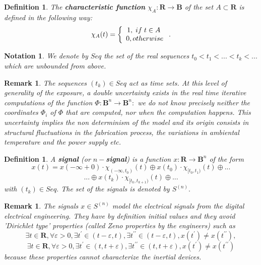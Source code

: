 \documentclass[12pt]{article}\usepackage{amsmath}
\newtheorem{definition}[theorem]{Definition}
\newtheorem{notation}[theorem]{Notation}
\newtheorem{remark}[theorem]{Remark}
\begin{document}
\begin{definition}
The \textbf{characteristic function} $\chi_{A}:\mathbf{R}\rightarrow
\mathbf{B}$ of the set $A\subset\mathbf{R}$ is defined in the following way:\[
\chi_{A}(t)=\left\{
\begin{array}
[c]{c}1,\;if\;t\in A\;\\
0,otherwise
\end{array}
\right.  .
\]

\end{definition}

\begin{notation}
We denote by $Seq$ the set of the real sequences $t_{0}<t_{1}<...<t_{k}<...$
which are unbounded from above.
\end{notation}

\begin{remark}
The sequences $(t_{k})\in Seq$ act as time sets. At this level of generality
of the exposure, a double uncertainty exists in the real time iterative
computations of the function $\Phi:\mathbf{B}^{n}\rightarrow\mathbf{B}^{n}: $
we do not know precisely neither the coordinates $\Phi_{i}$ of $\Phi$ that are
computed, nor when the computation happens. This uncertainty implies the non
determinism of the model and its origin consists in structural fluctuations in
the fabrication process, the variations in ambiental temperature and the power
supply etc.
\end{remark}

\begin{definition}
A \textbf{signal} (or $n-$\textbf{signal}) is a function $x:\mathbf{R}\rightarrow\mathbf{B}^{n}$ of the form\begin{equation}
x(t)=x(-\infty+0)\cdot\chi_{(-\infty,t_{0})}(t)\oplus x(t_{0})\cdot
\chi_{\lbrack t_{0},t_{1})}(t)\oplus... \label{pre1}\end{equation}\[
...\oplus x(t_{k})\cdot\chi_{\lbrack t_{k},t_{k+1})}(t)\oplus...
\]
with $(t_{k})\in Seq.$ The set of the signals is denoted by $S^{(n)}.$
\end{definition}

\begin{remark}
The signals $x\in S^{(n)}$ model the electrical signals from the digital
electrical engineering. They have by definition initial values and they avoid
'Dirichlet type' properties (called Zeno properties by the engineers) such as\[
\exists t\in\mathbf{R},\forall\varepsilon>0,\exists t^{\prime}\in
(t-\varepsilon,t),\exists t^{\prime\prime}\in(t-\varepsilon,t),x(t^{\prime
})\neq x(t^{\prime\prime}),
\]\[
\exists t\in\mathbf{R},\forall\varepsilon>0,\exists t^{\prime}\in
(t,t+\varepsilon),\exists t^{\prime\prime}\in(t,t+\varepsilon),x(t^{\prime
})\neq x(t^{\prime\prime})
\]
because these properties cannot characterize the inertial devices.
\end{remark}
\end{document}
